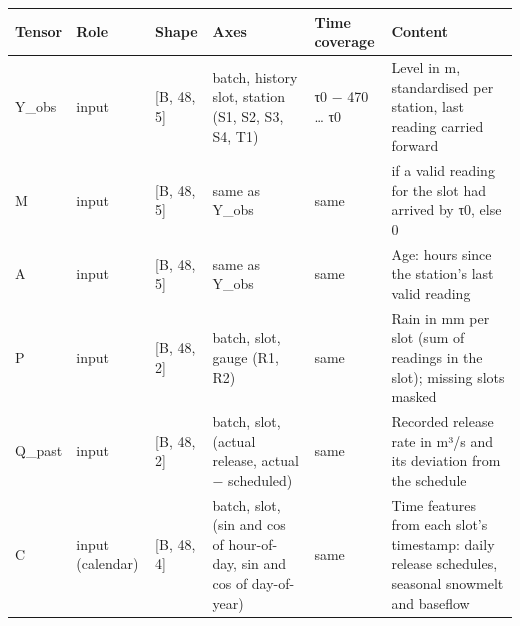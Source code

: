 \documentclass[11pt]{article}
\newcounter{none} %
\begin{document}
{\def\LTcaptype{none} %
\begin{longtable}[]{@{}
  >{\raggedright\arraybackslash}p{}
  >{\raggedright\arraybackslash}p{}
  >{\raggedright\arraybackslash}p{}
  >{\raggedright\arraybackslash}p{}
  >{\raggedright\arraybackslash}p{}
  >{\raggedright\arraybackslash}p{}@{}}
\toprule\noalign{}
\begin{minipage}[b]{\linewidth}\raggedright
Tensor
\end{minipage} & \begin{minipage}[b]{\linewidth}\raggedright
Role
\end{minipage} & \begin{minipage}[b]{\linewidth}\raggedright
Shape
\end{minipage} & \begin{minipage}[b]{\linewidth}\raggedright
Axes
\end{minipage} & \begin{minipage}[b]{\linewidth}\raggedright
Time coverage
\end{minipage} & \begin{minipage}[b]{\linewidth}\raggedright
Content
\end{minipage} \\
\midrule\noalign{}
\endhead
\bottomrule\noalign{}
\endlastfoot
Y\_obs & input & {[}B, 48, 5{]} & batch, history slot, station (S1, S2, S3, S4, T1) & τ0 − 470 \ldots{} τ0 & Level in m, standardised per station, last reading carried forward \\
M & input & {[}B, 48, 5{]} & same as Y\_obs & same & 1 if a valid reading for the slot had arrived by τ0, else 0 \\
A & input & {[}B, 48, 5{]} & same as Y\_obs & same & Age: hours since the station's last valid reading \\
P & input & {[}B, 48, 2{]} & batch, slot, gauge (R1, R2) & same & Rain in mm per slot (sum of readings in the slot); missing slots masked \\
Q\_past & input & {[}B, 48, 2{]} & batch, slot, (actual release, actual − scheduled) & same & Recorded release rate in m³/s and its deviation from the schedule \\
C & input (calendar) & {[}B, 48, 4{]} & batch, slot, (sin and cos of hour-of-day, sin and cos of day-of-year) & same & Time features from each slot's timestamp: daily release schedules, seasonal snowmelt and baseflow \\

\end{longtable}}
\end{document}
